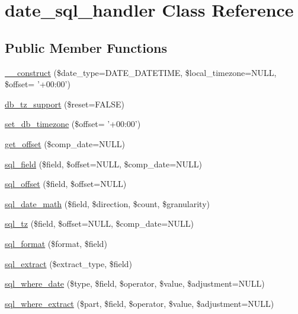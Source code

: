 \hypertarget{classdate__sql__handler}{
\section{date\_\-sql\_\-handler Class Reference}
\label{classdate__sql__handler}
}
\subsection*{Public Member Functions}
\begin{DoxyCompactItemize}
\item 
\hyperlink{classdate__sql__handler_adcee5f97d8e796260dc0048e9ed2d24e}{\_\-\_\-construct} (\$date\_\-type=DATE\_\-DATETIME, \$local\_\-timezone=NULL, \$offset= '+00:00')
\item 
\hyperlink{classdate__sql__handler_a6ccfadfd3fdc10a73515a572a881874c}{db\_\-tz\_\-support} (\$reset=FALSE)
\item 
\hyperlink{classdate__sql__handler_a3b90dc8718e14ec4ae3b2ee7f2d81cfd}{set\_\-db\_\-timezone} (\$offset= '+00:00')
\item 
\hyperlink{classdate__sql__handler_a4c0829b7a4ab472cb070c19e1608dc7a}{get\_\-offset} (\$comp\_\-date=NULL)
\item 
\hyperlink{classdate__sql__handler_aab48696c365846196f8ff2ecb105d010}{sql\_\-field} (\$field, \$offset=NULL, \$comp\_\-date=NULL)
\item 
\hyperlink{classdate__sql__handler_a86e10af9491fe99da8c8c6239620f3de}{sql\_\-offset} (\$field, \$offset=NULL)
\item 
\hyperlink{classdate__sql__handler_acacf47cb3362f3455a7e872b51ccf660}{sql\_\-date\_\-math} (\$field, \$direction, \$count, \$granularity)
\item 
\hyperlink{classdate__sql__handler_a6e3a20d322159d5c704b5c06bbf2501b}{sql\_\-tz} (\$field, \$offset=NULL, \$comp\_\-date=NULL)
\item 
\hyperlink{classdate__sql__handler_ab64ba4906fa0a61312a2bc3072275243}{sql\_\-format} (\$format, \$field)
\item 
\hyperlink{classdate__sql__handler_a1a4028680e7d617328581eb7b5b779a9}{sql\_\-extract} (\$extract\_\-type, \$field)
\item 
\hyperlink{classdate__sql__handler_ac3532976b8e7c016775e71cf873dfffe}{sql\_\-where\_\-date} (\$type, \$field, \$operator, \$value, \$adjustment=NULL)
\item 
\hyperlink{classdate__sql__handler_a2e88fbe05ec50038f3df0d63a9548623}{sql\_\-where\_\-extract} (\$part, \$field, \$operator, \$value, \$adjustment=NULL)

\end{DoxyCompactItemize}
